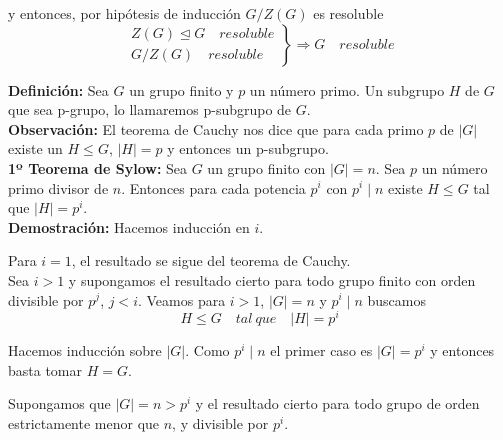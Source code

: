 \documentclass{article}
\begin{document}
y entonces, por hipótesis de inducción $G/Z(G)$ es resoluble
\begin{equation*}
\left.\begin{array}{c}
Z(G)\unlhd G\quad resoluble\\
G/Z(G)\quad resoluble
\end{array}\right\rbrace \Rightarrow G\quad resoluble
\end{equation*}

\textbf{Definición:} Sea $G$ un grupo finito y $p$ un número primo. Un subgrupo $H$ de $G$ que sea p-grupo, lo llamaremos p-subgrupo de $G$. \\

\textbf{Observación:} El teorema de Cauchy nos dice que para cada primo $p$ de $|G|$ existe un $H\leq G$, $|H|=p$ y entonces un p-subgrupo. \\

\textbf{1º Teorema de Sylow:} Sea $G$ un grupo finito con $|G|=n$. Sea $p$ un número primo divisor de $n$. Entonces para cada potencia $p^i$ con $p^i\mid n$ existe $H\leq G$ tal que $|H|=p^i$. \\

\textbf{Demostración:} Hacemos inducción en $i$.

Para $i=1$, el resultado se sigue del teorema de Cauchy. \\

Sea $i>1$ y supongamos el resultado cierto para todo grupo finito con orden divisible por $p^j$, $j<i$. Veamos para $i>1$, $|G|=n$ y $p^i\mid n$ buscamos
\begin{equation*}
H\leq G\quad tal\:que \quad |H|=p^i
\end{equation*}

Hacemos inducción sobre $|G|$. Como $p^i\mid n$ el primer caso es $|G|=p^i$ y entonces basta tomar $H=G$. 

Supongamos que $|G|=n>p^i$ y el resultado cierto para todo grupo de orden estrictamente menor que $n$, y divisible por $p^i$.
\end{document}
